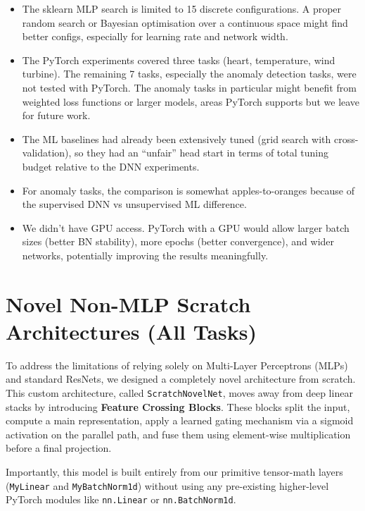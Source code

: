 \documentclass[11pt,a4paper]{article}
\begin{document}
\begin{itemize}[leftmargin=1.2em,itemsep=0.15em]
    \item The sklearn MLP search is limited to 15 discrete configurations. A proper random search or Bayesian optimisation over a continuous space might find better configs, especially for learning rate and network width.
    \item The PyTorch experiments covered three tasks (heart, temperature, wind turbine). The remaining 7 tasks, especially the anomaly detection tasks, were not tested with PyTorch. The anomaly tasks in particular might benefit from weighted loss functions or larger models, areas PyTorch supports but we leave for future work.
    \item The ML baselines had already been extensively tuned (grid search with cross-validation), so they had an ``unfair'' head start in terms of total tuning budget relative to the DNN experiments.
    \item For anomaly tasks, the comparison is somewhat apples-to-oranges because of the supervised DNN vs unsupervised ML difference.
    \item We didn't have GPU access. PyTorch with a GPU would allow larger batch sizes (better BN stability), more epochs (better convergence), and wider networks, potentially improving the results meaningfully.
\end{itemize}


\section{Novel Non-MLP Scratch Architectures (All Tasks)}

To address the limitations of relying solely on Multi-Layer Perceptrons (MLPs) and standard ResNets, we designed a completely novel architecture from scratch. This custom architecture, called \texttt{ScratchNovelNet}, moves away from deep linear stacks by introducing \textbf{Feature Crossing Blocks}. These blocks split the input, compute a main representation, apply a learned gating mechanism via a sigmoid activation on the parallel path, and fuse them using element-wise multiplication before a final projection. 

Importantly, this model is built entirely from our primitive tensor-math layers (\texttt{MyLinear} and \texttt{MyBatchNorm1d}) without using any pre-existing higher-level PyTorch modules like \texttt{nn.Linear} or \texttt{nn.BatchNorm1d}. 
\end{document}
